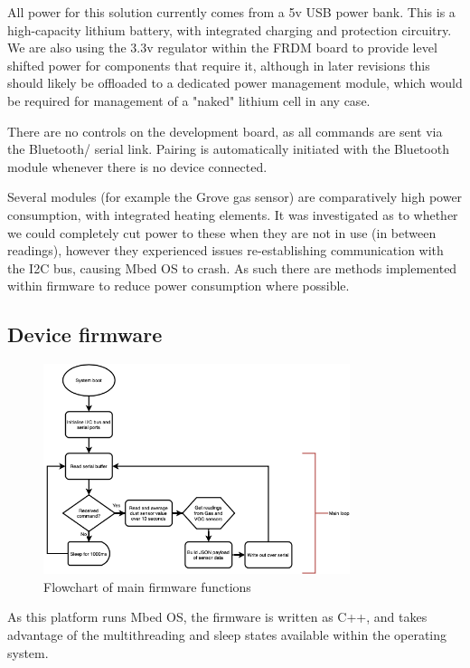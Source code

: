 \documentclass[sigconf, nonacm]{acmart}
\begin{document}
All power for this solution currently comes from a 5v USB power bank. This is a high-capacity
lithium battery, with integrated charging and protection circuitry. We are also using the
3.3v regulator within the FRDM board to provide level shifted power for components that require 
it, although in later revisions this should likely be offloaded to a dedicated power management
module, which would be required for management of a "naked" lithium cell in any case.

There are no controls on the development board, as all commands are sent via the Bluetooth/
serial link. Pairing is automatically initiated with the Bluetooth module whenever there is
no device connected.

Several modules (for example the Grove gas sensor) are comparatively high power consumption, 
with integrated heating elements. It was investigated as to whether we could completely cut
power to these when they are not in use (in between readings), however they experienced issues
re-establishing communication with the I2C bus, causing Mbed OS to crash. As such there are
methods implemented within firmware to reduce power consumption where possible.

\subsection{Device firmware}

\begin{figure}
	\includegraphics[width=0.8\textwidth]{firmware-flow}
	\caption{Flowchart of main firmware functions}
	\label{fig:firmwareflow}
\end{figure}

As this platform runs Mbed OS, the firmware is written as C++, and takes advantage of the 
multithreading and sleep states available within the operating system.
\end{document}
